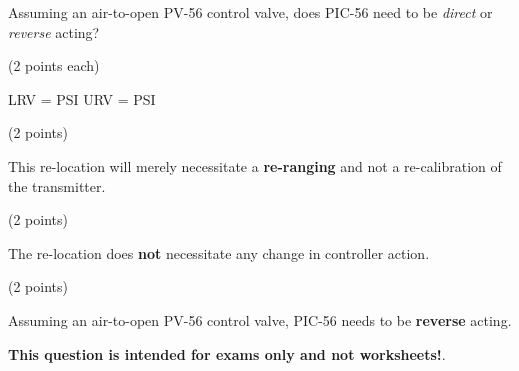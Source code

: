 Assuming an air-to-open PV-56 control valve, does PIC-56 need to be {\it direct} or {\it reverse} acting?







\noindent
(2 points each)

LRV =  PSI \hskip 30pt  URV =  PSI

\vskip 10pt

\noindent
(2 points)

This re-location will merely necessitate a {\bf re-ranging} and not a re-calibration of the transmitter.

\vskip 10pt

\noindent
(2 points)

The re-location does {\bf not} necessitate any change in controller action.

\vskip 10pt

\noindent
(2 points)

Assuming an air-to-open PV-56 control valve, PIC-56 needs to be {\bf reverse} acting.








{\bf This question is intended for exams only and not worksheets!}.



